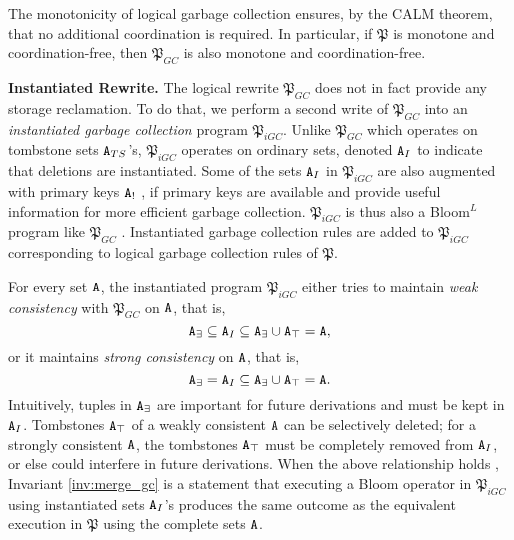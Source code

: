 The monotonicity of logical garbage collection ensures, by the CALM theorem, that no additional coordination is required.
In particular, if $\mathfrak{P}$ is monotone and coordination-free, then $\mathfrak{P}_{GC}$ is also monotone and coordination-free.


\textbf{Instantiated Rewrite.}
The logical rewrite $\mathfrak{P}_{GC}$ does not in fact provide any storage reclamation.
To do that, we perform a second write of $\mathfrak{P}_{GC}$ into an \emph{instantiated garbage collection} program $\mathfrak{P}_{iGC}$.
Unlike $\mathfrak{P}_{GC}$ which operates on tombstone sets $\tt{A}_{TS}$'s, $\mathfrak{P}_{iGC}$ operates on ordinary sets, denoted $\tt{A}_I$ to indicate that deletions are instantiated.
Some of the sets $\tt{A}_I$ in $\mathfrak{P}_{iGC}$ are also augmented with primary keys $\tt{A}_!$ , if primary keys are available and provide useful information for more efficient garbage collection.
$\mathfrak{P}_{iGC}$ is thus also a Bloom$^L$ program like $\mathfrak{P}_{GC}$ .
Instantiated garbage collection rules are added to $\mathfrak{P}_{iGC}$ corresponding to logical garbage collection rules of $\mathfrak{P}$.

For every set $\tt{A}$, the instantiated program $\mathfrak{P}_{iGC}$ either tries to  maintain \emph{weak consistency}  with $\mathfrak{P}_{GC}$ on $\tt{A}$, that is,
\[ \tt{A}_\exists \subseteq \tt{A}_I \subseteq \tt{A}_\exists \cup \tt{A}_\top = \tt{A},\]
or it maintains \emph{strong consistency}  on $\tt{A}$, that is,
\[ \tt{A}_\exists = \tt{A}_I \subseteq \tt{A}_\exists \cup \tt{A}_\top = \tt{A}.\]
Intuitively, tuples in $\tt{A}_\exists$ are important for future derivations and must be kept in $\tt{A}_I$.
Tombstones $\tt{A}_\top$ of a weakly consistent $\tt{A}$ can be selectively deleted; for a strongly consistent $\tt{A}$, the tombstones $\tt{A}_\top$ must be completely removed from $\tt{A}_I$, or else could interfere in future derivations.
When the above relationship holds , Invariant \ref{inv:merge_gc} is a statement that executing a Bloom operator in $\mathfrak{P}_{iGC}$ using instantiated sets $\tt{A}_I$'s produces the same outcome as the equivalent execution in $\mathfrak{P}$ using the complete sets $\tt{A}$. 

